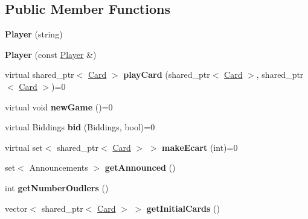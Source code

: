 \subsection*{\-Public \-Member \-Functions}
\begin{DoxyCompactItemize}
\item 
\hypertarget{classPlayer_ab6de8696558d726f4f733c2e1f07b828}{{\bfseries \-Player} (string)}\label{classPlayer_ab6de8696558d726f4f733c2e1f07b828}

\item 
\hypertarget{classPlayer_a8826850c4f8a2871819713ef61148836}{{\bfseries \-Player} (const \hyperlink{classPlayer}{\-Player} \&)}\label{classPlayer_a8826850c4f8a2871819713ef61148836}

\item 
\hypertarget{classPlayer_a58a78820547a048f180c6134bfd7261b}{virtual shared\-\_\-ptr$<$ \hyperlink{classCard}{\-Card} $>$ {\bfseries play\-Card} (shared\-\_\-ptr$<$ \hyperlink{classCard}{\-Card} $>$, shared\-\_\-ptr$<$ \hyperlink{classCard}{\-Card} $>$)=0}\label{classPlayer_a58a78820547a048f180c6134bfd7261b}

\item 
\hypertarget{classPlayer_a76a707ceb6f24b0a2a801434ee5a60ad}{virtual void {\bfseries new\-Game} ()=0}\label{classPlayer_a76a707ceb6f24b0a2a801434ee5a60ad}

\item 
\hypertarget{classPlayer_a7062295825e0c5f8dfa3696d8fc9f197}{virtual \-Biddings {\bfseries bid} (\-Biddings, bool)=0}\label{classPlayer_a7062295825e0c5f8dfa3696d8fc9f197}

\item 
\hypertarget{classPlayer_a6999ed9da7ce6744c4e47a789f42455c}{virtual set$<$ shared\-\_\-ptr$<$ \hyperlink{classCard}{\-Card} $>$ $>$ {\bfseries make\-Ecart} (int)=0}\label{classPlayer_a6999ed9da7ce6744c4e47a789f42455c}

\item 
\hypertarget{classPlayer_aa1c5b7d16fb6fd0427b404e89850a84b}{set$<$ \-Announcements $>$ {\bfseries get\-Announced} ()}\label{classPlayer_aa1c5b7d16fb6fd0427b404e89850a84b}

\item 
\hypertarget{classPlayer_af242539c463b23a5712e2343af483d99}{int {\bfseries get\-Number\-Oudlers} ()}\label{classPlayer_af242539c463b23a5712e2343af483d99}

\item 
\hypertarget{classPlayer_a18e512170f8327237dbfced03155015c}{vector$<$ shared\-\_\-ptr$<$ \hyperlink{classCard}{\-Card} $>$ $>$ {\bfseries get\-Initial\-Cards} ()}\label{classPlayer_a18e512170f8327237dbfced03155015c}


\end{DoxyCompactItemize}
